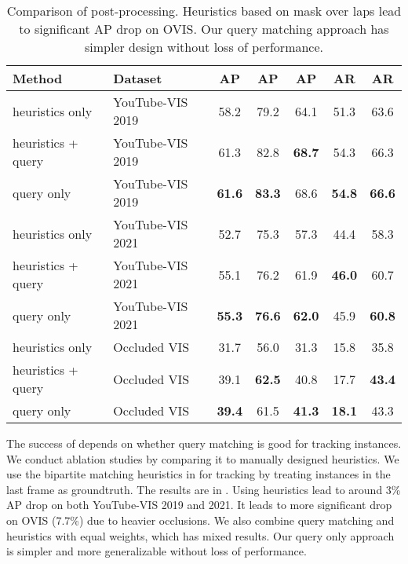 \begin{table}
  \caption{Comparison of post-processing. Heuristics based on mask over laps lead to significant AP drop on OVIS. Our query matching approach has simpler design without loss of performance.}
  \label{tab:heu}
  \centering
  \tabfontsize
  \begin{tabular}{llccccc}
    \toprule
Method             & Dataset          & AP   & AP & AP & AR & AR \\\midrule
heuristics only    & YouTube-VIS 2019 & 58.2 & 79.2      & 64.1      & 51.3   & 63.6      \\
heuristics + query & YouTube-VIS 2019 & 61.3 & 82.8      & \textbf{68.7}      & 54.3   & 66.3      \\
query only         & YouTube-VIS 2019 & \textbf{61.6} & \textbf{83.3}      & 68.6      & \textbf{54.8}   & \textbf{66.6}      \\\midrule
heuristics only    & YouTube-VIS 2021 & 52.7 & 75.3      & 57.3      & 44.4   & 58.3      \\
heuristics + query & YouTube-VIS 2021 & 55.1 & 76.2      & 61.9      & \textbf{46.0}   & 60.7      \\
query only         & YouTube-VIS 2021 & \textbf{55.3} & \textbf{76.6}      & \textbf{62.0}      & 45.9   & \textbf{60.8}      \\\midrule
heuristics only    & Occluded VIS     & 31.7 & 56.0      & 31.3      & 15.8   & 35.8      \\
heuristics + query & Occluded VIS     & 39.1 & \textbf{62.5}      & 40.8      & 17.7   & \textbf{43.4}      \\
query only         & Occluded VIS     & \textbf{39.4} & 61.5      & \textbf{41.3}      & \textbf{18.1}   & 43.3      \\
    \bottomrule
  \end{tabular}
\end{table}



The success of \ours depends on whether query matching is good for tracking instances. We conduct ablation studies by comparing it to manually designed heuristics. We use the bipartite matching heuristics in  for tracking by treating instances in the last frame as groundtruth. The results are in . Using heuristics lead to around 3\% AP drop on both YouTube-VIS 2019 and 2021. It leads to more significant drop on OVIS (7.7\%) due to heavier occlusions. We also combine query matching and heuristics with equal weights, which has mixed results. Our query only approach is simpler and more generalizable without loss of performance.



